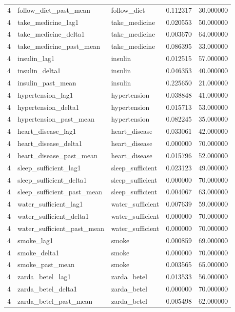 \begin{longtable}{rllrr}
4 & follow\_diet\_past\_mean & follow\_diet & 0.112317 & 30.000000 \\
4 & take\_medicine\_lag1 & take\_medicine & 0.020553 & 50.000000 \\
4 & take\_medicine\_delta1 & take\_medicine & 0.003670 & 64.000000 \\
4 & take\_medicine\_past\_mean & take\_medicine & 0.086395 & 33.000000 \\
4 & insulin\_lag1 & insulin & 0.012515 & 57.000000 \\
4 & insulin\_delta1 & insulin & 0.046353 & 40.000000 \\
4 & insulin\_past\_mean & insulin & 0.225650 & 21.000000 \\
4 & hypertension\_lag1 & hypertension & 0.038848 & 41.000000 \\
4 & hypertension\_delta1 & hypertension & 0.015713 & 53.000000 \\
4 & hypertension\_past\_mean & hypertension & 0.082245 & 35.000000 \\
4 & heart\_disease\_lag1 & heart\_disease & 0.033061 & 42.000000 \\
4 & heart\_disease\_delta1 & heart\_disease & 0.000000 & 70.000000 \\
4 & heart\_disease\_past\_mean & heart\_disease & 0.015796 & 52.000000 \\
4 & sleep\_sufficient\_lag1 & sleep\_sufficient & 0.023123 & 49.000000 \\
4 & sleep\_sufficient\_delta1 & sleep\_sufficient & 0.000000 & 70.000000 \\
4 & sleep\_sufficient\_past\_mean & sleep\_sufficient & 0.004067 & 63.000000 \\
4 & water\_sufficient\_lag1 & water\_sufficient & 0.007639 & 59.000000 \\
4 & water\_sufficient\_delta1 & water\_sufficient & 0.000000 & 70.000000 \\
4 & water\_sufficient\_past\_mean & water\_sufficient & 0.000000 & 70.000000 \\
4 & smoke\_lag1 & smoke & 0.000859 & 69.000000 \\
4 & smoke\_delta1 & smoke & 0.000000 & 70.000000 \\
4 & smoke\_past\_mean & smoke & 0.003565 & 65.000000 \\
4 & zarda\_betel\_lag1 & zarda\_betel & 0.013533 & 56.000000 \\
4 & zarda\_betel\_delta1 & zarda\_betel & 0.000000 & 70.000000 \\
4 & zarda\_betel\_past\_mean & zarda\_betel & 0.005498 & 62.000000 \\

\end{longtable}
